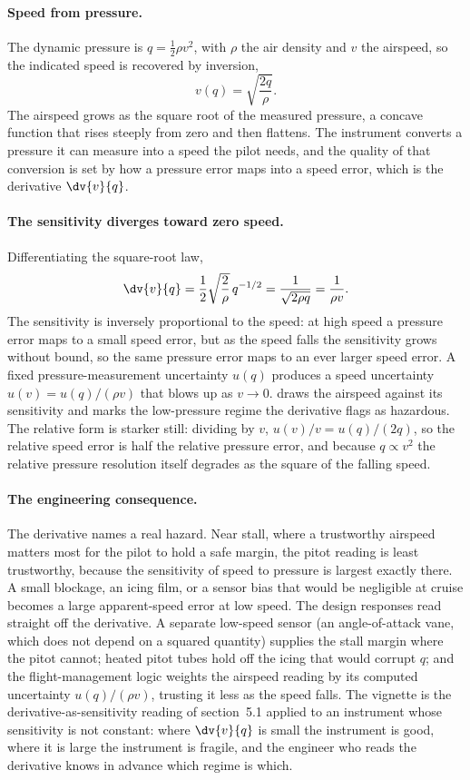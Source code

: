 \paragraph{Speed from pressure.}
The dynamic pressure is $q = \tfrac{1}{2}\rho v^{2}$, with $\rho$ the
air density and $v$ the airspeed, so the indicated speed is recovered by
inversion,
\[
v(q) = \sqrt{\frac{2 q}{\rho}}.
\]
The airspeed grows as the square root of the measured pressure, a
concave function that rises steeply from zero and then flattens. The
instrument converts a pressure it can measure into a speed the pilot
needs, and the quality of that conversion is set by how a pressure error
maps into a speed error, which is the derivative $\dv{v}{q}$.

\paragraph{The sensitivity diverges toward zero speed.}
Differentiating the square-root law,
\[
\dv{v}{q} = \frac{1}{2}\sqrt{\frac{2}{\rho}}\,q^{-1/2} =
\frac{1}{\sqrt{2\rho q}} = \frac{1}{\rho v}.
\]
The sensitivity is inversely proportional to the speed: at high speed a
pressure error maps to a small speed error, but as the speed falls the
sensitivity grows without bound, so the same pressure error maps to an
ever larger speed error. A fixed pressure-measurement uncertainty
$u(q)$ produces a speed uncertainty $u(v) = u(q)/(\rho v)$ that blows up
as $v \to 0$.  draws the airspeed
against its sensitivity and marks the low-pressure regime the derivative
flags as hazardous. The relative form is starker still: dividing by
$v$, $u(v)/v = u(q)/(2q)$, so the relative speed error is half the
relative pressure error, and because $q \propto v^{2}$ the relative
pressure resolution itself degrades as the square of the falling speed.



\paragraph{The engineering consequence.}
The derivative names a real hazard. Near stall, where a trustworthy
airspeed matters most for the pilot to hold a safe margin, the pitot
reading is least trustworthy, because the sensitivity of speed to
pressure is largest exactly there. A small blockage, an icing film, or
a sensor bias that would be negligible at cruise becomes a large
apparent-speed error at low speed. The design responses read straight
off the derivative. A separate low-speed sensor (an angle-of-attack
vane, which does not depend on a squared quantity) supplies the stall
margin where the pitot cannot; heated pitot tubes hold off the icing
that would corrupt $q$; and the flight-management logic weights the
airspeed reading by its computed uncertainty $u(q)/(\rho v)$, trusting
it less as the speed falls. The vignette is the derivative-as-sensitivity
reading of section~5.1 applied to an instrument whose sensitivity is not
constant: where $\dv{v}{q}$ is small the instrument is good, where it is
large the instrument is fragile, and the engineer who reads the
derivative knows in advance which regime is which.

